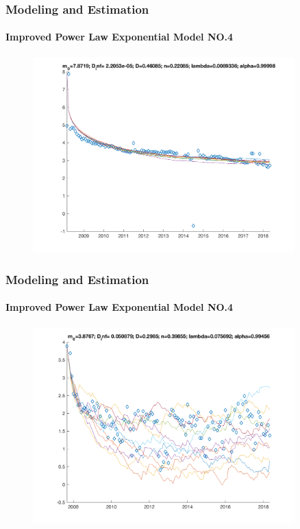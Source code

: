 \documentclass[11pt]{beamer}
\begin{document}
\begin{frame}
	\frametitle{Modeling and Estimation}
	\framesubtitle{Improved Power Law Exponential Model NO.4}
	\justifying
\begin{figure}
\begin{center}
\includegraphics[width=0.9\textwidth  ]{AAplot_374} 
\end{center}
\end{figure}				
\end{frame}	

\begin{frame}
	\frametitle{Modeling and Estimation}
	\framesubtitle{Improved Power Law Exponential Model NO.4}
	\justifying
\begin{figure}
\begin{center}
\includegraphics[width=0.9\textwidth  ]{AAplot_1153} 
\end{center}
\end{figure}				
\end{frame}	
\end{document}
